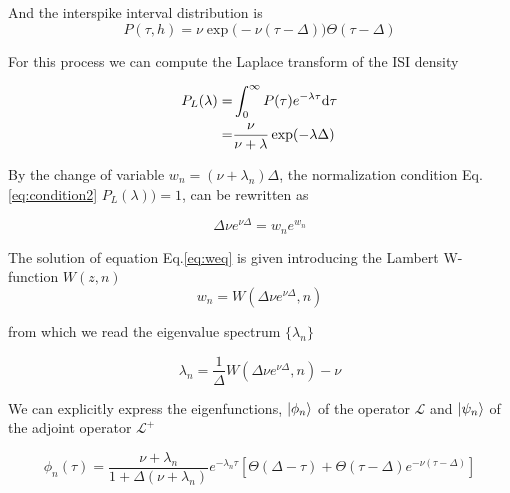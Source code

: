 \documentclass[12pt,twoside]{report}
\def \dd  {{\rm d}}
\begin{document}
And the interspike interval distribution is 
\begin{equation}
P(\tau,h)=\nu\exp\big(-\nu(\tau-\Delta)\big) \Theta(\tau-\Delta) 
\end{equation}


For this process we can compute the Laplace transform of the ISI density

\begin{align}
P_L(\lambda)=&\int_0^\infty P(\tau)e^{-\lambda \tau}\dd \tau\nonumber\\
=&\frac{\nu}{\nu+\lambda}\exp(-\lambda \Delta)
\end{align}


By the change of variable $w_n=(\nu+\lambda_n)\Delta$, the normalization condition Eq.\eqref{eq:condition2} $P_L(\lambda))=1$, can be rewritten as


\begin{equation}
\label{eq:weq}
\Delta \nu e^{\nu\Delta}=w_ne^{w_n} 
\end{equation}

The solution of equation Eq.\eqref{eq:weq} is given introducing the Lambert W-function $W(z,n)$
\begin{equation}
w_n=W(\Delta \nu e^{\nu\Delta},n)
\end{equation}

from which we read the eigenvalue spectrum $\{\lambda_n\}$

\begin{equation}
\lambda_n=\frac{1}{\Delta}W(\Delta \nu e^{\nu\Delta},n) - \nu
\end{equation}

We can explicitly express the eigenfunctions, $\ket{\phi_n}$ of the operator $\mathcal{L}$ and $\ket{\psi_n}$ of  the adjoint operator $\mathcal{L}^+$


\begin{equation}
\phi_n(\tau)= \frac{\nu+\lambda_n}{1+\Delta(\nu+\lambda_n)}e^{-\lambda_n\tau}\left[\Theta(\Delta-\tau) +  \Theta(\tau-\Delta)e^{-\nu(\tau-\Delta)}\right]
\end{equation}
\end{document}
